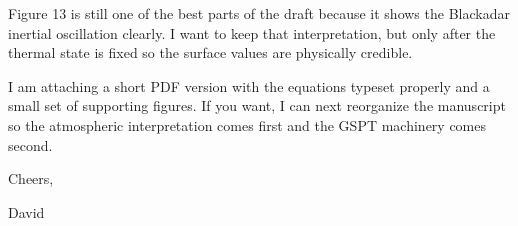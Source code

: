\documentclass[11pt]{article}
\begin{document}
Figure 13 is still one of the best parts of the draft because it shows the Blackadar inertial oscillation clearly. I want to keep that interpretation, but only after the thermal state is fixed so the surface values are physically credible.

I am attaching a short PDF version with the equations typeset properly and a small set of supporting figures. If you want, I can next reorganize the manuscript so the atmospheric interpretation comes first and the GSPT machinery comes second.

Cheers,

David
\end{document}
